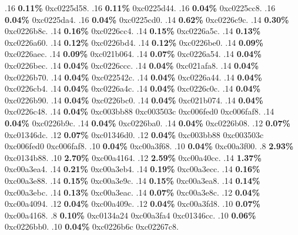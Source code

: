 \begin{profile}
{.16 \textbf{0.11\%} 0xc0225d58. 
.16 \textbf{0.11\%} 0xc0225d44. 
.16 \textbf{0.04\%} 0xc0225cc8. 
.16 \textbf{0.04\%} 0xc0225da4. 
.16 \textbf{0.04\%} 0xc0225cd0. 
.14 \textbf{0.62\%} 0xc0226c9c. 
.14 \textbf{0.30\%} 0xc0226b8c. 
.14 \textbf{0.16\%} 0xc0226cc4. 
.14 \textbf{0.15\%} 0xc0226a5c. 
.14 \textbf{0.13\%} 0xc0226a60. 
.14 \textbf{0.12\%} 0xc0226bd4. 
.14 \textbf{0.12\%} 0xc0226be0. 
.14 \textbf{0.09\%} 0xc0226aec. 
.14 \textbf{0.09\%} 0xc021b064. 
.14 \textbf{0.07\%} 0xc0226a54. 
.14 \textbf{0.04\%} 0xc0226bec. 
.14 \textbf{0.04\%} 0xc0226ccc. 
.14 \textbf{0.04\%} 0xc021afa8. 
.14 \textbf{0.04\%} 0xc0226b70. 
.14 \textbf{0.04\%} 0xc022542c. 
.14 \textbf{0.04\%} 0xc0226a44. 
.14 \textbf{0.04\%} 0xc0226cb4. 
.14 \textbf{0.04\%} 0xc0226a4c. 
.14 \textbf{0.04\%} 0xc0226c0c. 
.14 \textbf{0.04\%} 0xc0226b90. 
.14 \textbf{0.04\%} 0xc0226bc0. 
.14 \textbf{0.04\%} 0xc021b074. 
.14 \textbf{0.04\%} 0xc0226c48. 
.14 \textbf{0.04\%} 0xc003bb88\newline {} 0xc003503c\newline {} 0xc006fed0\newline {} 0xc006faf8. 
.14 \textbf{0.04\%} 0xc0226b9c. 
.14 \textbf{0.04\%} 0xc0226ba0. 
.14 \textbf{0.04\%} 0xc0226b08. 
.12 \textbf{0.07\%} 0xc01346dc. 
.12 \textbf{0.07\%} 0xc01346d0. 
.12 \textbf{0.04\%} 0xc003bb88\newline {} 0xc003503c\newline {} 0xc006fed0\newline {} 0xc006faf8. 
.10 \textbf{0.04\%} 0xc00a3f68. 
.10 \textbf{0.04\%} 0xc00a3f00. 
.8 \textbf{2.93\%} 0xc0134b88. 
.10 \textbf{2.70\%} 0xc00a4164. 
.12 \textbf{2.59\%} 0xc00a40cc. 
.14 \textbf{1.37\%} 0xc00a3ea4. 
.14 \textbf{0.21\%} 0xc00a3eb4. 
.14 \textbf{0.19\%} 0xc00a3ecc. 
.14 \textbf{0.16\%} 0xc00a3e88. 
.14 \textbf{0.15\%} 0xc00a3e9c. 
.14 \textbf{0.15\%} 0xc00a3ea8. 
.14 \textbf{0.14\%} 0xc00a3ebc. 
.14 \textbf{0.13\%} 0xc00a3eac. 
.14 \textbf{0.07\%} 0xc00a3e8c. 
.12 \textbf{0.04\%} 0xc00a4094. 
.12 \textbf{0.04\%} 0xc00a409c. 
.12 \textbf{0.04\%} 0xc00a3fd8. 
.10 \textbf{0.07\%} 0xc00a4168. 
.8 \textbf{0.10\%} 0xc0134a24\newline {} 0xc00a3fa4\newline {} 0xc01346cc. 
.10 \textbf{0.06\%} 0xc0226bb0. 
.10 \textbf{0.04\%} 0xc0226b6c\newline {} 0xc02267c8. 
}
\end{profile}
